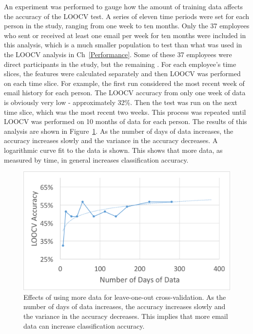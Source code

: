 \documentclass[12pt]{report}
\begin{document}
An experiment was performed to gauge how the amount of training data affects the accuracy of the LOOCV test.
A series of eleven time periods were set for each person in the study, ranging from one week to ten months.
Only the 37 employees who sent or received at least one email per week for ten months were included in this analysis, which is a much smaller population to test than what was used in the LOOCV analysis in Ch~\ref{Performance}.
Some of these 37 employees were direct participants in the study, but the remaining .
For each employee's time slices, the features were calculated separately and then LOOCV was performed on each time slice.
For example, the first run considered the most recent week of email history for each person.
The LOOCV accuracy from only one week of data is obviously very low - approximately 32\%.
Then the test was run on the next time slice, which was the most recent two weeks.
This process was repeated until LOOCV was performed on 10 months of data for each person.
The results of this analysis are shown in Figure~\ref{fig:loocv_generalization}.
As the number of days of data increases, the accuracy increases slowly and the variance in the accuracy decreases.
A logarithmic curve fit to the data is shown.
This shows that more data, as measured by time, in general increases classification accuracy.
\begin{figure}[t]
    \centering
        \includegraphics[width=.7\columnwidth,trim={0mm 0mm 0mm 0mm},clip]{num_days_LOOCV}
        \vspace{-7pt}
        \caption[Effects of more data on prediction accuracy]{Effects of using more data for leave-one-out cross-validation.  As the number of days of data increases, the accuracy increases slowly and the variance in the accuracy decreases.  This implies that more email data can increase classification accuracy.}
        \label{fig:loocv_generalization}
\end{figure}
\end{document}

